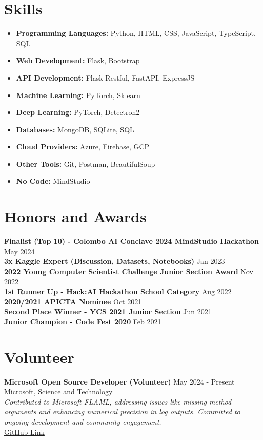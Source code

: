 \documentclass[10pt,letterpaper]{article}
\begin{document}
\section*{Skills}
\begin{itemize}[leftmargin=*,label={\color{darkgray}\textbullet}]
    \item \textbf{Programming Languages:} Python, HTML, CSS, JavaScript, TypeScript, SQL
\item \textbf{Web Development:} Flask, Bootstrap
\item \textbf{API Development:} Flask Restful, FastAPI, ExpressJS
\item \textbf{Machine Learning:} PyTorch, Sklearn
\item \textbf{Deep Learning:} PyTorch, Detectron2
\item \textbf{Databases:} MongoDB, SQLite, SQL
\item \textbf{Cloud Providers:} Azure, Firebase, GCP
\item \textbf{Other Tools:} Git, Postman, BeautifulSoup
\item \textbf{No Code:} MindStudio
\end{itemize}

\section*{Honors and Awards}
\textbf{Finalist (Top 10) - Colombo AI Conclave 2024 MindStudio Hackathon} \hfill May 2024 \\
\textbf{3x Kaggle Expert (Discussion, Datasets, Notebooks)} \hfill Jan 2023 \\
\textbf{2022 Young Computer Scientist Challenge Junior Section Award} \hfill Nov 2022 \\
\textbf{1st Runner Up - Hack:AI Hackathon School Category} \hfill Aug 2022 \\
\textbf{2020/2021 APICTA Nominee} \hfill Oct 2021 \\
\textbf{Second Place Winner - YCS 2021 Junior Section} \hfill Jun 2021 \\
\textbf{Junior Champion - Code Fest 2020} \hfill Feb 2021 \\

\section*{Volunteer}

\textbf{Microsoft Open Source Developer (Volunteer)} \hfill May 2024 - Present \\
Microsoft, Science and Technology \\
\textit{Contributed to Microsoft FLAML, addressing issues like missing method arguments and enhancing numerical precision in log outputs. Committed to ongoing development and community engagement.} \\
\href{https://github.com/Programmer-RD-AI/FLAML}{GitHub Link}
\end{document}
